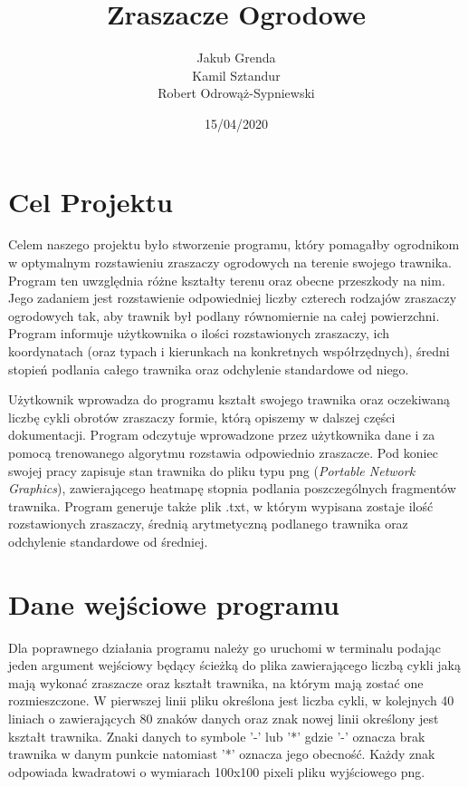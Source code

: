 \documentclass[a4paper]{article}
\title{\textbf{Zraszacze Ogrodowe}}
\author{Jakub Grenda\\ Kamil Sztandur\\ Robert Odrowąż-Sypniewski}
\date{15/04/2020}
\begin{document}
\maketitle

\section{Cel Projektu}
Celem naszego projektu było stworzenie programu, który pomagałby ogrodnikom w optymalnym rozstawieniu zraszaczy ogrodowych na terenie swojego trawnika. Program ten uwzględnia różne kształty terenu oraz obecne przeszkody na nim. Jego zadaniem jest rozstawienie odpowiedniej liczby czterech rodzajów zraszaczy ogrodowych tak, aby trawnik był podlany równomiernie na całej powierzchni. Program informuje użytkownika o ilości rozstawionych zraszaczy, ich koordynatach (oraz typach i kierunkach na konkretnych współrzędnych), średni stopień podlania całego trawnika oraz odchylenie standardowe od niego.
\newline

Użytkownik wprowadza do programu kształt swojego trawnika oraz oczekiwaną liczbę cykli obrotów zraszaczy formie, którą opiszemy w dalszej części dokumentacji. Program odczytuje wprowadzone przez użytkownika dane i za pomocą trenowanego algorytmu rozstawia odpowiednio zraszacze. Pod koniec swojej pracy zapisuje stan trawnika do pliku typu png (\textit{Portable Network Graphics}), zawierającego heatmapę stopnia podlania poszczególnych fragmentów trawnika. Program generuje także plik .txt, w którym wypisana zostaje ilość rozstawionych zraszaczy, średnią arytmetyczną podlanego trawnika oraz odchylenie standardowe od średniej.

\section{Dane wejściowe programu}
Dla poprawnego działania programu należy go uruchomi w terminalu podając jeden argument wejściowy będący ścieżką do plika zawierającego liczbą cykli jaką mają wykonać zraszacze oraz kształt trawnika, na którym mają zostać one rozmieszczone. W pierwszej linii pliku określona jest liczba cykli, w kolejnych 40 liniach o zawierających 80 znaków danych oraz znak nowej linii określony jest kształt trawnika. Znaki danych to symbole '-' lub '*' gdzie '-' oznacza brak trawnika w danym punkcie natomiast '*' oznacza jego obecność. Każdy znak odpowiada kwadratowi o wymiarach 100x100 pixeli pliku wyjściowego png.

\newpage
\end{document}
